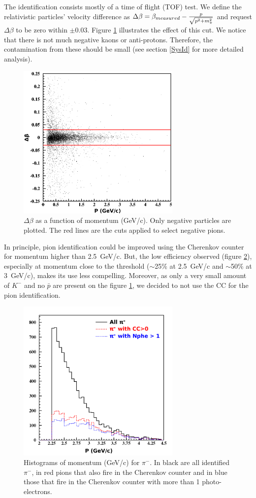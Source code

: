 The identification consists mostly of a time of flight (TOF) test. We define 
the relativistic particles' velocity difference as
$\Delta \beta = \beta_{measured} - {p \over \sqrt{p^2 + m_\pi^2}}$ and request 
$\Delta \beta$ to be zero within $\pm 0.03$. Figure \ref{PionTOF} illustrates 
the effect of this cut. We notice that there is not much negative kaons or 
anti-protons. Therefore, the contamination from these should be small (see 
section \ref{SysId} for more detailed analysis).

\begin{figure}[tbp]
\centering
\includegraphics[width=8cm] {chap5-fig/fig05.png} 
\caption {$\Delta \beta$ as a 
function of momentum (GeV/c). Only negative particles are plotted. The red 
lines are the cuts applied to select negative pions.}
\label{PionTOF}
\end{figure}

In principle, pion identification could be improved using the Cherenkov counter 
for momentum higher than 2.5~GeV/c. But, the low efficiency observed (figure 
\ref{PionCC}), especially at momentum close to the threshold ($\sim$25\% at 
2.5~GeV/c and $\sim$50\% at 3~GeV/c), makes its use less compelling. 
Moreover, as only a very small amount of $K^-$ and no $\bar p$ are present on 
the figure \ref{PionTOF}, we decided to not use the CC for the pion identification.

\begin{figure}[tbp]
\centering
\includegraphics[width=8cm] {chap5-fig/fig06.png} 
\caption {Histograms of momentum (GeV/c) for $\pi^-$. In black are all 
identified $\pi^-$, in red pions that also fire in the Cherenkov counter and 
in blue those that fire in the Cherenkov counter with more than 
1 photo-electrons.}
\label{PionCC}
\end{figure}

